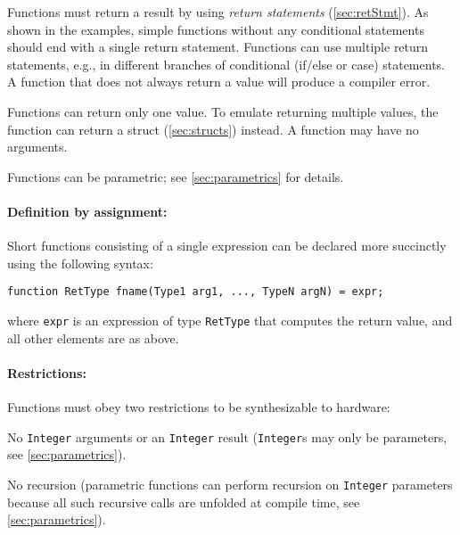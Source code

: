 Functions must return a result by using \emph{return statements} (\autoref{sec:retStmt}).
As shown in the examples, simple functions without any conditional statements
should end with a single return statement.
Functions can use multiple return statements, e.g., in different branches
of conditional (if/else or case) statements.
A function that does not always return a value will produce a compiler error.

Functions can return only one value. To emulate returning multiple values, the
function can return a struct (\autoref{sec:structs}) instead.
%
A function may have no arguments.

Functions can be parametric; see \autoref{sec:parametrics} for details.

\paragraph{Definition by assignment:}
Short functions consisting of a single expression can be declared more succinctly using the following syntax:
\begin{center}
\verb|function RetType fname(Type1 arg1, ..., TypeN argN) = expr;|
\end{center}
where \verb|expr| is an expression of type \verb|RetType| that computes the return value,
and all other elements are as above.


\paragraph{Restrictions:}
Functions must obey two restrictions to be synthesizable to hardware:
\begin{compactenum}
\item No \texttt{Integer} arguments or an \texttt{Integer} result
  (\texttt{Integer}s may only be parameters, see \autoref{sec:parametrics}).
\item No recursion
  (parametric functions can perform recursion on \texttt{Integer} parameters
  because all such recursive calls are unfolded at compile time, see \autoref{sec:parametrics}).
\end{compactenum}

